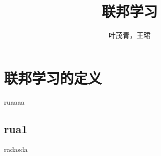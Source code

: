 \documentclass[10pt,twocolumn,letterpaper]{article}
\begin{document}
    \title{联邦学习}
    \author{叶茂青，王珺}

    \maketitle

    \section{联邦学习的定义}
    ruaaaa\cite{li2019federated}
    \subsection{rua1}
    radasda

    {\small
         
        
    }
\end{document}
